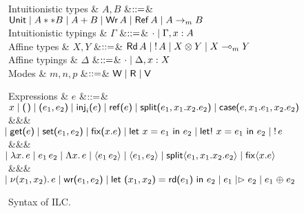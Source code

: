 \begin{figure*}[t]
  \begin{grammar}
    Intuitionistic types
    & $A,B$
    &$\bnfas$& $\tyUnit \bnfalt \tyProd{A}{B} \bnfalt \tySum{A}{B} \bnfalt
    \tyWr{A} \bnfalt \tyRef{A} \bnfalt \tyArr{A}{\footnotesize m}{B}$
    \\
    Intuitionistic typings
    & $\Gamma$
    &$\bnfas$& $\emptyctxt \bnfalt \Gamma,x:A$
    \\
    Affine types
    & $X,Y$
    &$\bnfas$& $\tyRd{A} \bnfalt \tyBang{A} \bnfalt \tyTensor{X}{Y} \bnfalt
    \tyLolli{X}{\footnotesize m}{Y}$
    \\
    Affine typings
    & $\Delta$
    &$\bnfas$& $\emptyctxt \bnfalt \Delta,x:X$
    \\
    Modes & $m,n,p$ &$\bnfas$& $\Wm \bnfalt \Rm \bnfalt \Vm$    
  \end{grammar}
  \begin{grammar}
    Expressions
    & $e$
        &$\bnfas$&
        $\eVar{x} \bnfalt \eUnit \bnfalt \ePair{e_1}{e_2} \bnfalt \eInj{i}{e}
    \bnfalt \eRef{e} \bnfalt \eSplit{e_1}{x_1}{x_2}{e_2} \bnfalt
    \eCase{e}{x_1}{e_1}{x_2}{e_2}$
    \\ &&& $\bnfaltbrk \eGet{e} \bnfalt \eSet{e_1}{e_2} \bnfalt \eFix{x}{e}
    \bnfalt \eLet{x}{e_1}{e_2} \bnfalt \eLetBang{x}{e_1}{e_2} \bnfalt \eBang{e}$
    \\ &&& $\bnfaltbrk \eLam{x}{e} \bnfalt \eApp{e_1}{e_2} \bnfalt \eLAM{x}{e}
    \bnfalt \eLapp{e_1}{e_2} \bnfalt \eLPair{e_1}{e_2} \bnfalt
    \eLsplit{e_1}{x_1}{x_2}{e_2} \bnfalt \eLfix{x}{e}$
    \\ &&& $\bnfaltbrk \eNu{(x_1,x_2)}{e} \bnfalt \eWr{e_1}{e_2}
    \bnfalt \eLetRd{x_1}{x_2}{e_1}{e_2} \bnfalt \eFork{e_1}{e_2} \bnfalt \eChoice{e_1}{e_2}$
  \end{grammar}
  \caption{Syntax of ILC. }
  \label{fig:ilc-syntax}
\end{figure*}
